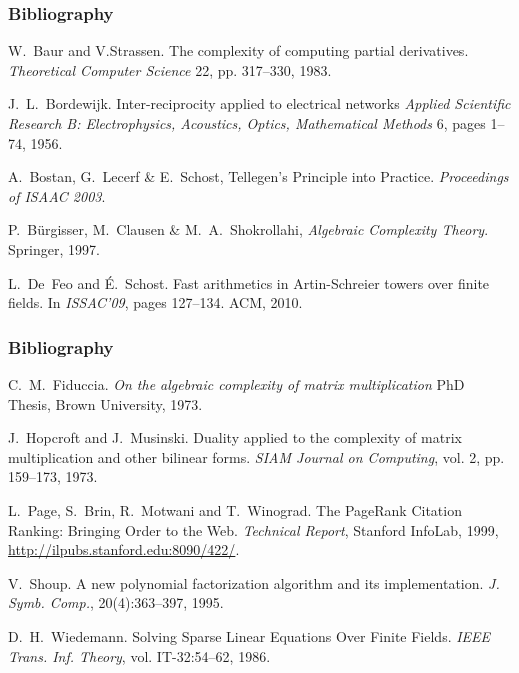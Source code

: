 \documentclass[10pt]{beamer}
\begin{document}
\begin{frame}
  \frametitle{Bibliography}

  \begin{thebibliography}{1}
    
    W.~Baur and V.Strassen.
    \newblock The complexity of computing partial derivatives.
    \newblock \emph{Theoretical Computer Science} 22, pp. 317--330, 1983.

    J.~L.~Bordewijk.
    \newblock Inter-reciprocity applied to electrical networks
    \newblock \emph{Applied Scientific Research B: Electrophysics, Acoustics, Optics, Mathematical Methods} 6, pages 1--74, 1956.

  A.~Bostan, G.~Lecerf \& E.~Schost,
    \newblock Tellegen's Principle into Practice.
    \newblock \emph{Proceedings of ISAAC 2003}.

  P.~Bürgisser, M.~Clausen \& M.~A.~Shokrollahi,
    \newblock \emph{Algebraic Complexity Theory}.
    \newblock Springer, 1997.

    L.~De~Feo and {\'E}.~Schost.
    \newblock Fast arithmetics in Artin-Schreier towers over finite fields. 
    \newblock In \emph{ISSAC'09}, pages 127--134. ACM, 2010.

  \end{thebibliography}
\end{frame}

\begin{frame}
  \frametitle{Bibliography}

  \begin{thebibliography}{1}
  
    C.~M.~Fiduccia.
    \newblock \emph{On the algebraic complexity of matrix multiplication}
    \newblock PhD Thesis, Brown University, 1973.

    J.~Hopcroft and J.~Musinski.
    \newblock Duality applied to the complexity of matrix multiplication
    and other bilinear forms.
    \newblock \emph{SIAM Journal on Computing}, vol. 2, pp. 159–173, 1973.
 
    L.~Page, S.~Brin, R.~Motwani and T.~Winograd.
    \newblock The PageRank Citation Ranking: Bringing Order to the Web.
    \newblock \emph{Technical Report}, Stanford InfoLab, 1999,
    \url{http://ilpubs.stanford.edu:8090/422/}.

    V.~Shoup.
    \newblock A new polynomial factorization algorithm and its implementation.
    \newblock \emph{J. Symb. Comp.}, 20(4):363--397, 1995.
    
    D.~H.~Wiedemann.
    \newblock Solving Sparse Linear Equations Over Finite Fields.
    \newblock \emph{IEEE Trans. Inf. Theory}, vol. IT-32:54--62, 1986.

  \end{thebibliography}
\end{frame}
\end{document}
